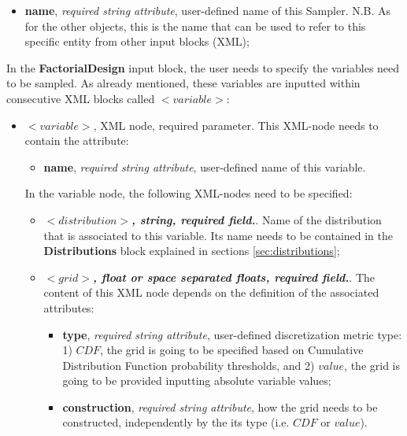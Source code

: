 \begin{itemize}
\itemsep0em
\item \textbf{name}, \textit{required string attribute}, user-defined name of this Sampler. N.B. As for the other objects, this is the name that can be used to refer to this specific entity from other input blocks (XML);
\end{itemize}
In the \textbf{FactorialDesign} input block, the user needs to specify the variables need to be sampled. As already mentioned, these variables are inputted within consecutive XML blocks called $<variable>$:
\begin{itemize}
\item $<variable>$, XML node, required parameter. This XML-node needs to contain the attribute:
\begin{itemize}
  \item \textbf{name}, \textit{required string attribute}, user-defined name of this variable.
\end{itemize}
 In the variable node, the following XML-nodes need to be specified:
 \begin{itemize}
    \item $<distribution>$\textbf{\textit{, string, required field.}}. Name of the distribution that is associated to this variable. Its name needs to be contained in the \textbf{Distributions} block explained in sections \ref{sec:distributions};
\item $<grid>$\textbf{\textit{, float or space separated floats, required field.}}. The content of this XML node depends on the definition of the associated attributes:
\begin{itemize}
\itemsep0em
\item \textbf{type}, \textit{required string attribute}, user-defined discretization metric type: 1) $CDF$, the grid is going to be specified based on  Cumulative Distribution Function probability thresholds, and 2) $value$, the grid is going to be provided inputting absolute variable values;
\item \textbf{construction}, \textit{required string attribute}, how the grid needs to be constructed, independently by the its type (i.e. $CDF$ or $value$).
\end{itemize}


\end{itemize}
\end{itemize}
